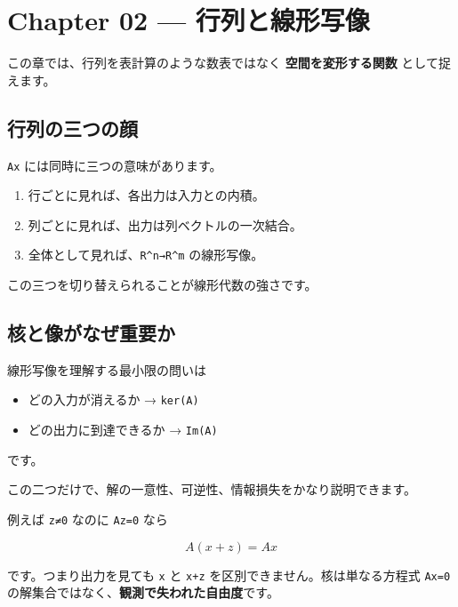 \documentclass[
  11pt,
  a4paper,
]{ltjsarticle}
\author{}
\date{}
\providecommand{\tightlist}{%
  \setlength{\itemsep}{0pt}\setlength{\parskip}{0pt}}
\begin{document}
\hypertarget{chapter-02-ux884cux5217ux3068ux7ddaux5f62ux5199ux50cf}{%
\section{Chapter 02 ---
行列と線形写像}\label{chapter-02-ux884cux5217ux3068ux7ddaux5f62ux5199ux50cf}}

この章では、行列を表計算のような数表ではなく \textbf{空間を変形する関数}
として捉えます。

\hypertarget{ux884cux5217ux306eux4e09ux3064ux306eux9854}{%
\subsection{行列の三つの顔}\label{ux884cux5217ux306eux4e09ux3064ux306eux9854}}

\texttt{Ax} には同時に三つの意味があります。

\begin{enumerate}
\def\labelenumi{\arabic{enumi}.}
\tightlist
\item
  行ごとに見れば、各出力は入力との内積。
\item
  列ごとに見れば、出力は列ベクトルの一次結合。
\item
  全体として見れば、\texttt{R\^{}n→R\^{}m} の線形写像。
\end{enumerate}

この三つを切り替えられることが線形代数の強さです。

\hypertarget{ux6838ux3068ux50cfux304cux306aux305cux91cdux8981ux304b}{%
\subsection{核と像がなぜ重要か}\label{ux6838ux3068ux50cfux304cux306aux305cux91cdux8981ux304b}}

線形写像を理解する最小限の問いは

\begin{itemize}
\tightlist
\item
  どの入力が消えるか → \texttt{ker(A)}
\item
  どの出力に到達できるか → \texttt{Im(A)}
\end{itemize}

です。

この二つだけで、解の一意性、可逆性、情報損失をかなり説明できます。

例えば \texttt{z≠0} なのに \texttt{Az=0} なら

\[
A(x+z)=Ax
\]

です。つまり出力を見ても \texttt{x} と \texttt{x+z}
を区別できません。核は単なる方程式 \texttt{Ax=0}
の解集合ではなく、\textbf{観測で失われた自由度}です。
\end{document}
